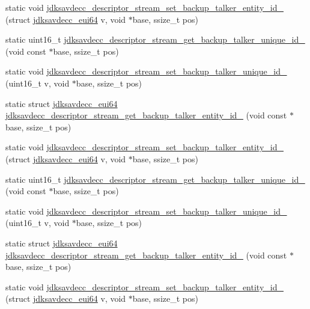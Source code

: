 \begin{DoxyCompactItemize}
\item 
static void \hyperlink{group__descriptor__stream_ga52a9a2d2f656ef1d073fe1bbf36ac7f4}{jdksavdecc\+\_\+descriptor\+\_\+stream\+\_\+set\+\_\+backup\+\_\+talker\+\_\+entity\+\_\+id\+\_} (struct \hyperlink{structjdksavdecc__eui64}{jdksavdecc\+\_\+eui64} v, void $\ast$base, ssize\+\_\+t pos)
\item 
static uint16\+\_\+t \hyperlink{group__descriptor__stream_ga09b50d193cab1d10e356f8516e2e9c4a}{jdksavdecc\+\_\+descriptor\+\_\+stream\+\_\+get\+\_\+backup\+\_\+talker\+\_\+unique\+\_\+id\+\_} (void const $\ast$base, ssize\+\_\+t pos)
\item 
static void \hyperlink{group__descriptor__stream_gaa4fb1cb911eabfb874c2806898b0818e}{jdksavdecc\+\_\+descriptor\+\_\+stream\+\_\+set\+\_\+backup\+\_\+talker\+\_\+unique\+\_\+id\+\_} (uint16\+\_\+t v, void $\ast$base, ssize\+\_\+t pos)
\item 
static struct \hyperlink{structjdksavdecc__eui64}{jdksavdecc\+\_\+eui64} \hyperlink{group__descriptor__stream_ga42b7f2e287b4be0aff42464ba69a9c89}{jdksavdecc\+\_\+descriptor\+\_\+stream\+\_\+get\+\_\+backup\+\_\+talker\+\_\+entity\+\_\+id\+\_} (void const $\ast$base, ssize\+\_\+t pos)
\item 
static void \hyperlink{group__descriptor__stream_ga6488ba2f367c22d29e205a88c65225f1}{jdksavdecc\+\_\+descriptor\+\_\+stream\+\_\+set\+\_\+backup\+\_\+talker\+\_\+entity\+\_\+id\+\_} (struct \hyperlink{structjdksavdecc__eui64}{jdksavdecc\+\_\+eui64} v, void $\ast$base, ssize\+\_\+t pos)
\item 
static uint16\+\_\+t \hyperlink{group__descriptor__stream_ga265da4603d296982b48396849793ce68}{jdksavdecc\+\_\+descriptor\+\_\+stream\+\_\+get\+\_\+backup\+\_\+talker\+\_\+unique\+\_\+id\+\_} (void const $\ast$base, ssize\+\_\+t pos)
\item 
static void \hyperlink{group__descriptor__stream_ga6bafa59427d44f43f24fce065d171a31}{jdksavdecc\+\_\+descriptor\+\_\+stream\+\_\+set\+\_\+backup\+\_\+talker\+\_\+unique\+\_\+id\+\_} (uint16\+\_\+t v, void $\ast$base, ssize\+\_\+t pos)
\item 
static struct \hyperlink{structjdksavdecc__eui64}{jdksavdecc\+\_\+eui64} \hyperlink{group__descriptor__stream_gab3addd377a0cb8b941f948d6256d4b2a}{jdksavdecc\+\_\+descriptor\+\_\+stream\+\_\+get\+\_\+backup\+\_\+talker\+\_\+entity\+\_\+id\+\_} (void const $\ast$base, ssize\+\_\+t pos)
\item 
static void \hyperlink{group__descriptor__stream_gaee2d5340ca32434a012a7f50d8249f2d}{jdksavdecc\+\_\+descriptor\+\_\+stream\+\_\+set\+\_\+backup\+\_\+talker\+\_\+entity\+\_\+id\+\_} (struct \hyperlink{structjdksavdecc__eui64}{jdksavdecc\+\_\+eui64} v, void $\ast$base, ssize\+\_\+t pos)

\end{DoxyCompactItemize}
